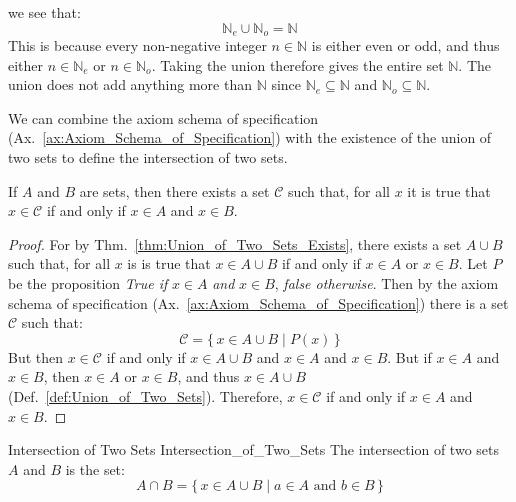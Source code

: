         we see that:
        \begin{equation}
            \mathbb{N}_{e}\cup\mathbb{N}_{o}=\mathbb{N}
        \end{equation}
        This is because every non-negative integer $n\in\mathbb{N}$ is
        either even or odd, and thus either $n\in\mathbb{N}_{e}$ or
        $n\in\mathbb{N}_{o}$. Taking the union therefore gives the entire
        set $\mathbb{N}$. The union does not add anything more than
        $\mathbb{N}$ since $\mathbb{N}_{e}\subseteq\mathbb{N}$ and
        $\mathbb{N}_{o}\subseteq\mathbb{N}$.
        \par\hfill\par
        We can combine the axiom schema of specification
        (Ax.~\ref{ax:Axiom_Schema_of_Specification}) with the existence of
        the union of two sets to define the intersection of two sets.
        \begin{theorem}
            If $A$ and $B$ are sets, then there exists a set $\mathcal{C}$
            such that, for all $x$ it is true that $x\in\mathcal{C}$ if and
            only if $x\in{A}$ and $x\in{B}$.
        \end{theorem}
        \begin{proof}
            For by Thm.~\ref{thm:Union_of_Two_Sets_Exists}, there exists
            a set $A\cup{B}$ such that, for all $x$ is is true that
            $x\in{A}\cup{B}$ if and only if $x\in{A}$ or $x\in{B}$. Let
            $P$ be the proposition \textit{True if} $x\in{A}$ \textit{and}
            $x\in{B}$, \textit{false otherwise}. Then by the axiom schema
            of specification (Ax.~\ref{ax:Axiom_Schema_of_Specification})
            there is a set $\mathcal{C}$ such that:
            \begin{equation}
                \mathcal{C}=\big\{\,x\in{A}\cup{B}\;|\;P(x)\,\big\}
            \end{equation}
            But then $x\in\mathcal{C}$ if and only if $x\in{A}\cup{B}$ and
            $x\in{A}$ and $x\in{B}$. But if $x\in{A}$ and $x\in{B}$, then
            $x\in{A}$ or $x\in{B}$, and thus $x\in{A}\cup{B}$
            (Def.~\ref{def:Union_of_Two_Sets}). Therefore, $x\in\mathcal{C}$
            if and only if $x\in{A}$ and $x\in{B}$.
        \end{proof}
        \begin{fdefinition}{Intersection of Two Sets}
                           {Intersection_of_Two_Sets}
            The \gls{intersection of two sets} $A$ and $B$ is the set:
            \begin{equation*}
                A\cap{B}
                =\big\{\,x\in{A}\cup{B}\;|\;
                    a\in{A}\textrm{ and }b\in{B}\,\big\}
            \end{equation*}
        \end{fdefinition}
